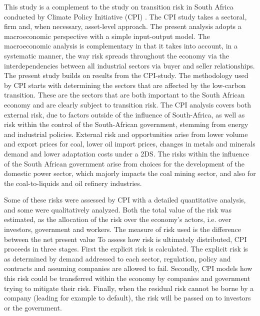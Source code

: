 \documentclass[12pt,english]{article}
\begin{document}
This study is a complement to the study on transition risk in South Africa conducted by Climate Policy Initiative (CPI) \citep{CPI2019SA}.
The CPI study takes a sectoral, firm and, when necessary, asset-level approach. The present analysis adopts a macroeconomic perspective with a simple input-output model. The macroeconomic analysis is complementary in that it takes into account, in a systematic manner, the way risk spreads throughout the economy via the interdependencies between all industrial sectors via buyer and seller relationships. %
The present study builds on results from the CPI-study. The methodology used by CPI starts with determining the sectors that are affected by the low-carbon transition. These are the sectors that are both important to the South African economy and are clearly subject to transition risk. 
The CPI analysis covers both external risk, due to factors outside of the influence of South-Africa, as well as risk within the control of the South-African government, stemming from energy and industrial policies. External risk and opportunities arise from lower volume and export prices for coal, lower oil import prices, changes in metals and minerals demand and lower adaptation costs under a 2DS.
The risks within the influence of the South African government arise from choices for the development of the domestic power sector, which majorly impacts the coal mining sector, and also for the coal-to-liquids and oil refinery industries. 

Some of these risks were assessed by CPI with a detailed quantitative analysis, and some were qualitatively analyzed. Both the total value of the risk was estimated, as the allocation of the risk over the economy's actors, i.e. over investors, government and workers. The measure of risk used is the difference between the net present value To assess how risk is ultimately distributed, CPI proceeds in three stages. First the explicit risk is calculated. The explicit risk is as determined by demand addressed to each sector, regulation, policy and contracts and assuming companies are allowed to fail. Secondly, CPI models how this risk could be transferred within the economy by companies and government trying to mitigate their risk. Finally, when the residual risk cannot be borne by a company (leading for example to default), the risk will be passed on to investors or the government. 
\end{document}
